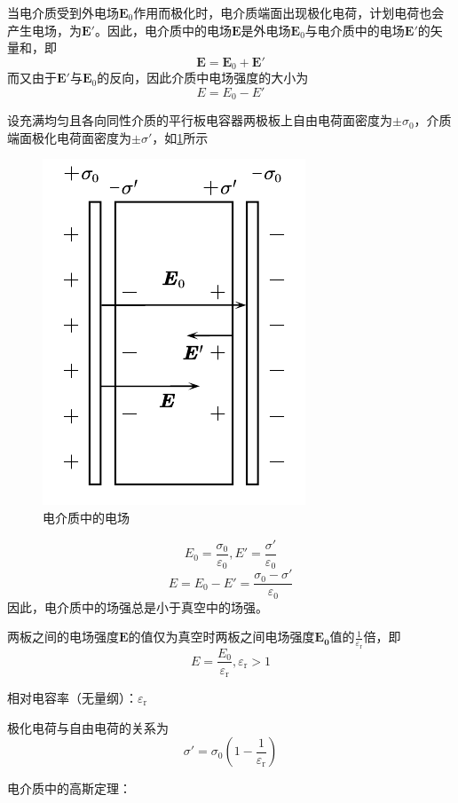 \documentclass[12pt, a4paper, twoside]{ctexbook}
\begin{document}
当电介质受到外电场$\boldsymbol{E}_0$作用而极化时，电介质端面出现极化电荷，计划电荷也会产生电场，为$\boldsymbol{E}'$。因此，电介质中的电场$\boldsymbol{E}$是外电场$\boldsymbol{E}_0$与电介质中的电场$\boldsymbol{E}'$的矢量和，即
$$
\boldsymbol{E}=\boldsymbol{E}_0+\boldsymbol{E}'
$$
而又由于$\boldsymbol{E}'$与$\boldsymbol{E}_0$的反向，因此介质中电场强度的大小为
$$
E=E_0-E'
$$

设充满均匀且各向同性介质的平行板电容器两极板上自由电荷面密度为$\pm\sigma_0$，介质端面极化电荷面密度为$\pm\sigma'$，如\textcolor{blue}{\cref{fig:电介质中的电场}}所示
\begin{figure}[H]
    \centerline{\includegraphics[scale=1.0]{电介质中的电场.pdf}}
    \caption{电介质中的电场}\label{fig:电介质中的电场}
\end{figure}
$$
E_0=\frac{\sigma_0}{\varepsilon_0},E'=\frac{\sigma'}{\varepsilon_0}
$$
$$
E=E_0-E'=\frac{\sigma_0-\sigma'}{\varepsilon_0}
$$
因此，电介质中的场强总是小于真空中的场强。

两板之间的电场强度$\boldsymbol{E}$的值仅为真空时两板之间电场强度$\boldsymbol{E_0}$值的$\frac{1}{\varepsilon_{\mathrm{r}}}$倍，即
$$
E=\frac{E_0}{\varepsilon_{\mathrm{r}}},\varepsilon_{\mathrm{r}}>1
$$

{\sonti 相对电容率（无量纲）}：$\varepsilon_{\mathrm{r}}$

极化电荷与自由电荷的关系为
$$
\sigma'=\sigma_0\left(1-\frac{1}{\varepsilon_{\mathrm{r}}}\right)
$$

{\sonti 电介质中的高斯定理}：
\end{document}
